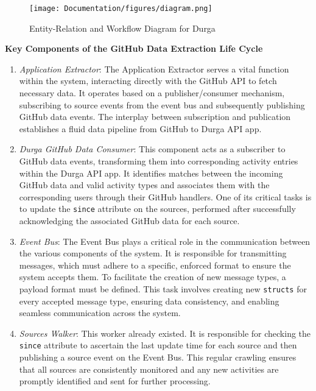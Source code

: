 \begin{figure}[htbp]
	\centering
	\texttt{[image: Documentation/figures/diagram.png]}  %
	\caption{Entity-Relation and Workflow Diagram for Durga}
	\label{durga}
\end{figure}

\textbf{Key Components of the GitHub Data Extraction Life Cycle}

\begin{enumerate}
    \item \textit{Application Extractor}: The Application Extractor serves a vital function within the system, interacting directly with the GitHub API to fetch necessary data. It operates based on a publisher/consumer mechanism, subscribing to source events from the event bus and subsequently publishing GitHub data events. The interplay between subscription and publication establishes a fluid data pipeline from GitHub to Durga API app.
    \item  \textit{Durga GitHub Data Consumer}: This component acts as a subscriber to GitHub data events, transforming them into corresponding activity entries within the Durga API app. It identifies matches between the incoming GitHub data and valid activity types and associates them with the corresponding users through their GitHub handlers. One of its critical tasks is to update the \texttt{since} attribute on the sources, performed after successfully acknowledging the associated GitHub data for each source.
    \item \textit{Event Bus}: The Event Bus plays a critical role in the communication between the various components of the system. It is responsible for transmitting messages, which must adhere to a specific, enforced format to ensure the system accepts them. To facilitate the creation of new message types, a payload format must be defined. This task involves creating new \texttt{structs} for every accepted message type, ensuring data consistency, and enabling seamless communication across the system. 
    \item \textit{Sources Walker}: This worker already existed. It is responsible for checking the \texttt{since} attribute to ascertain the last update time for each source and then publishing a source event on the Event Bus. This regular crawling ensures that all sources are consistently monitored and any new activities are promptly identified and sent for further processing.
\end{enumerate}


